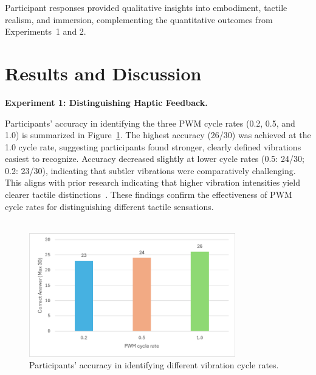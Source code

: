 \documentclass[graybox]{svmult}
\begin{document}
Participant responses provided qualitative insights into embodiment, tactile realism, and immersion, complementing the quantitative outcomes from Experiments~1 and 2.



\section{Results and Discussion}

\textbf{Experiment 1: Distinguishing Haptic Feedback.}  

Participants' accuracy in identifying the three PWM cycle rates (0.2, 0.5, and 1.0) is summarized in Figure~\ref{fig:ex1_results}. The highest accuracy (26/30) was achieved at the 1.0 cycle rate, suggesting participants found stronger, clearly defined vibrations easiest to recognize. Accuracy decreased slightly at lower cycle rates (0.5: 24/30; 0.2: 23/30), indicating that subtler vibrations were comparatively challenging. This aligns with prior research indicating that higher vibration intensities yield clearer tactile distinctions~\cite{strohmeier2017generating,bensmaia2005vibrations}. These findings confirm the effectiveness of PWM cycle rates for distinguishing different tactile sensations.
\\
\\
\begin{figure}\centering
	\includegraphics[width=0.8\textwidth]{figure/ex1_result.png}%
	\caption{Participants' accuracy in identifying different vibration cycle rates.}\label{fig:ex1_results}
\end{figure}
\end{document}
